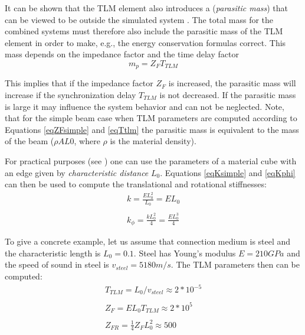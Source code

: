 It can be shown that the TLM element also introduces a (\emph{parasitic mass}) that can be viewed to be outside the simulated system \cite{KrusModMech-99}. The total mass for the combined systems must therefore also
include the parasitic mass of the TLM element in order to make, e.g., the energy conservation formulas correct. This mass depends on the impedance factor and the time delay factor
\begin{equation}
\label{eqMtlm}
m_p = Z_F T_{TLM}
\end{equation}

This implies that if the impedance factor $Z_F$  is increased, the parasitic mass will increase if the synchronization delay $T_{TLM}$ is not decreased. 
If the parasitic mass is large it may influence the system behavior and can not be neglected. 
Note, that for the simple beam case when TLM parameters are computed according to Equations \ref{eqZFsimple} and \ref{eqTtlm} the parasitic mass is equivalent to the mass of the beam ($\rho A L0$, where $\rho$ is the material density).

For practical purposes (see \cite{Fritzson+Stahl+Nakhimovski-07}) one can use the parameters of a material cube with an edge given by \emph{characteristic distance} $L_0$. 
Equations \ref{eqKsimple} and \ref{eqKphi} can then be used to compute the translational and rotational stiffnesses:
\begin{equation}
\begin{array}{l}
k = \frac{E L_0 ^2}{L_0} = E L_0 \\
\\
k_{\phi} = \frac{k L_0^2}{4} = \frac{E L_0^3}{4}
\end{array}
\end{equation}

To give a concrete example, let us assume that connection medium is steel and the characteristic length is $L_0 = 0.1$. Steel has  Young's modulus $E = 210 GPa$ and the speed of sound in steel is $v_{steel}=5180 m/s$.
The TLM parameters then can be computed:
\begin{equation}
\begin{array}{l}
T_{TLM} = L_0 / v_{steel} \approx 2*10^{-5} \\
\\
Z_F =  E L_0 T_{TLM} \approx 2 * 10^5 \\
\\
Z_{FR} =  \frac{1}{4}Z_F L_0^2 \approx 500
\end{array}
\end{equation}

